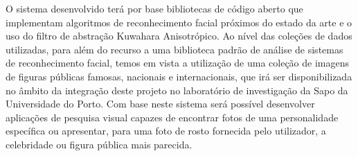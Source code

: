 O sistema desenvolvido terá por base bibliotecas de código aberto que implementam algoritmos de reconhecimento facial próximos do estado da arte e o uso do filtro de abstração Kuwahara Anisotrópico. Ao nível das coleções de dados utilizadas, para além do recurso a uma biblioteca padrão de análise de sistemas de reconhecimento facial, temos em vista a utilização de uma coleção de imagens de figuras públicas famosas, nacionais e internacionais, que irá ser disponibilizada no âmbito da integração deste projeto no laboratório de investigação da Sapo da Universidade do Porto. 
Com base neste sistema será possível desenvolver aplicações de pesquisa visual capazes de encontrar fotos de uma personalidade específica ou apresentar, para uma foto de rosto fornecida pelo utilizador, a celebridade ou figura pública mais parecida.